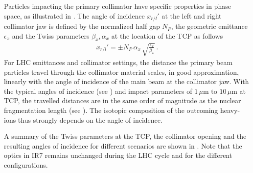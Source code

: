 Particles impacting the primary collimator have specific properties in phase space, as illustrated in . The angle of incidence $x_{r/l}'$ at the left and right collimator jaw is defined by the normalized half gap $N_P$, the geometric emittance $\epsilon_x$ and the Twiss parameters $\beta_x,\alpha_x$ at the location of the TCP as follows~\cite{wiedemann1999particle}
\begin{align}
x_{r/l}' = \pm N_P \, \alpha_x \, \sqrt{\frac{\epsilon_x}{\beta_x}} \, . \label{eq:angle_of_incidence}
\end{align}
%
For LHC emittances and collimator settings, the distance the primary beam particles travel through the collimator material scales, in good approximation, linearly with the angle of incidence of the main beam at the collimator jaw. With the typical angles of incidence (see ) and impact parameters of $1\,\mu$m to $10\,\mu$m at TCP, the travelled distances are in the same order of magnitude as the nuclear fragmentation length (see ). The isotopic composition of the outcoming heavy-ions thus strongly depends on the angle of incidence.







%
A summary of the Twiss parameters at the TCP, the collimator opening and the resulting angles of incidence for different scenarios are shown in . Note that the optics in IR7 remains unchanged during the LHC cycle and for the different configurations. 


